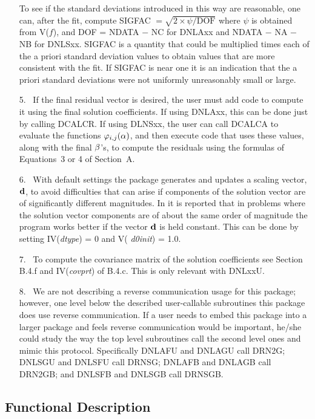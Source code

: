 \documentclass[twoside]{MATH77}
\begin{document}
\begin{itemize}
To see if the standard deviations introduced in this way are reasonable, one
can, after the fit, compute SIGFAC $=\sqrt {2\times \psi /\text{DOF}}$ where $%
\psi $ is obtained from V($f$), and DOF = NDATA $-$ NC for DNLAxx and
NDATA $-$ NA $-$ NB for
DNLSxx. SIGFAC is a quantity that could be multiplied times each of the a
priori standard deviation values to obtain values that are more consistent
with the fit. If SIGFAC is near one it is an indication that the a priori
standard deviations were not uniformly unreasonably small or large.
\item[5.]  \ If the final residual vector is desired, the user must add code
to compute it using the final solution coefficients. If using DNLAxx, this
can be done just by calling DCALCR. If using DLNSxx, the user can call
DCALCA to evaluate the functions $\varphi _{i,j}({\bf \alpha })$, and then
execute code that uses these values, along with the final ${\bf \beta }$'s,
to compute the residuals using the formulas of Equations~3 or 4 of Section~A.
\item[6.] \ With default settings the package generates and updates a
scaling vector, ${\bf d}$, to avoid difficulties that can arise if
components of the solution vector are of significantly different
magnitudes.  In \cite{Dennis:1981:ANL} it is reported that in problems
where the solution vector components are of about the same order of
magnitude the program works better if the vector ${\bf d}$ is held
constant.  This can be done by setting IV({\em dtype}) = 0 and V({\em
d0init}) = 1.0.
\item[7.]  \ To compute the covariance matrix of the solution coefficients
see Section B.4.f and IV({\em covprt}) of B.4.c.  This is only relevant
with DNLxxU.
\item[8.]  \ We are not describing a reverse communication usage for this
package; however, one level below the described user-callable subroutines
this package does use reverse communication. If a user needs to embed this
package into a larger package and feels reverse communication would be
important, he/she could study the way the top level subroutines call the
second level ones and mimic this protocol. Specifically DNLAFU and DNLAGU
call DRN2G; DNLSGU and DNLSFU call DRNSG; DNLAFB and DNLAGB call DRN2GB; and
DNLSFB and DNLSGB call DRNSGB.
\end{itemize}
\subsection{Functional Description}
\end{document}

